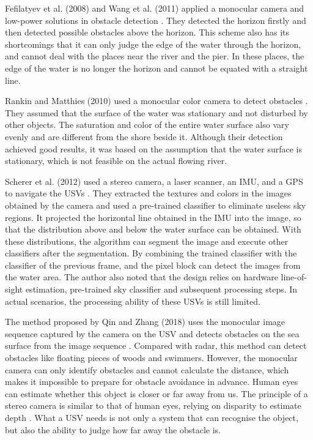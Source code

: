 \documentclass[sensors,article,submit,moreauthors,pdftex]{Definitions/mdpi}
\begin{document}
Fefilatyev et al. (2008) and Wang et al. (2011) applied a monocular camera and low-power solutions in obstacle detection \cite{4761344, 6070512}. They detected the horizon firstly and then detected possible obstacles above the horizon. This scheme also has its shortcomings that it can only judge the edge of the water through the horizon, and cannot deal with the places near the river and the pier. In these places, the edge of the water is no longer the horizon and cannot be equated with a straight line.

Rankin and Matthies (2010) used a monocular color camera to detect obstacles \cite{5650402}. They assumed that the surface of the water was stationary and not disturbed by other objects. The saturation and color of the entire water surface also vary evenly and are different from the shore beside it.
Although their detection achieved good results, it was based on the assumption that the water surface is stationary, which is not feasible on the actual flowing river.

Scherer et al. (2012) used a stereo camera, a laser scanner, an IMU, and a GPS to navigate the USVs \cite{scherer_river_2012}. They extracted the textures and colors in the images obtained by the camera and used a pre-trained classifier to eliminate useless sky regions. It projected the horizontal line obtained in the IMU into the image, so that the distribution above and below the water surface can be obtained. With these distributions, the algorithm can segment the image and execute other classifiers after the segmentation. By combining the trained classifier with the classifier of the previous frame, and the pixel block can detect the images from the water area. The author also noted that the design relies on hardware line-of-sight estimation, pre-trained sky classifier and subsequent processing steps. In actual scenarios, the processing ability of these USVs is still limited.


The method proposed by Qin and Zhang (2018) uses the monocular image sequence captured by the camera on the USV and detects obstacles on the sea surface from the image sequence \cite{qin2018robust}. Compared with radar, this method can detect obstacles like floating pieces of woods and swimmers. However, the monocular camera can only identify obstacles and cannot calculate the distance, which makes it impossible to prepare for obstacle avoidance in advance. Human eyes can estimate whether this object is closer or far away from us. The principle of a stereo camera is similar to that of human eyes, relying on disparity to estimate depth \cite{mustafah2012stereo}. What a USV needs is not only a system that can recognise the object, but also the ability to judge how far away the obstacle is.
\end{document}
